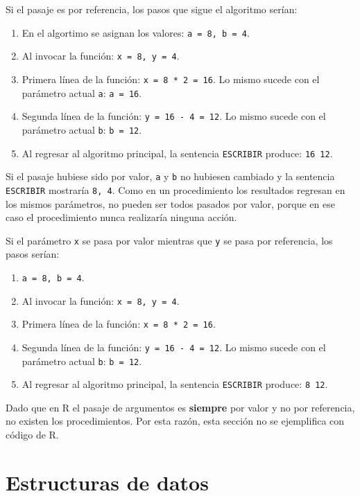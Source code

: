 \documentclass[
]{book}
\providecommand{\tightlist}{%
  \setlength{\itemsep}{0pt}\setlength{\parskip}{0pt}}
\begin{document}
Si el pasaje es por referencia, los pasos que sigue el algoritmo serían:

\begin{enumerate}
\def\labelenumi{\arabic{enumi}.}
\tightlist
\item
  En el algortimo se asignan los valores: \texttt{a\ =\ 8,\ b\ =\ 4}.
\item
  Al invocar la función: \texttt{x\ =\ 8,\ y\ =\ 4}.
\item
  Primera línea de la función: \texttt{x\ =\ 8\ *\ 2\ =\ 16}. Lo mismo sucede con el parámetro actual \texttt{a}: \texttt{a\ =\ 16}.
\item
  Segunda línea de la función: \texttt{y\ =\ 16\ -\ 4\ =\ 12}. Lo mismo sucede con el parámetro actual \texttt{b}: \texttt{b\ =\ 12}.
\item
  Al regresar al algoritmo principal, la sentencia \texttt{ESCRIBIR} produce: \texttt{16\ 12}.
\end{enumerate}

Si el pasaje hubiese sido por valor, \texttt{a} y \texttt{b} no hubiesen cambiado y la sentencia \texttt{ESCRIBIR} mostraría \texttt{8,\ 4}. Como en un procedimiento los resultados regresan en los mismos parámetros, no pueden ser todos pasados por valor, porque en ese caso el procedimiento nunca realizaría ninguna acción.

Si el parámetro \texttt{x} se pasa por valor mientras que \texttt{y} se pasa por referencia, los pasos serían:

\begin{enumerate}
\def\labelenumi{\arabic{enumi}.}
\tightlist
\item
  \texttt{a\ =\ 8,\ b\ =\ 4}.
\item
  Al invocar la función: \texttt{x\ =\ 8,\ y\ =\ 4}.
\item
  Primera línea de la función: \texttt{x\ =\ 8\ *\ 2\ =\ 16}.
\item
  Segunda línea de la función: \texttt{y\ =\ 16\ -\ 4\ =\ 12}. Lo mismo sucede con el parámetro actual \texttt{b}: \texttt{b\ =\ 12}.
\item
  Al regresar al algoritmo principal, la sentencia \texttt{ESCRIBIR} produce: \texttt{8\ 12}.
\end{enumerate}

Dado que en R el pasaje de argumentos es \textbf{siempre} por valor y no por referencia, no existen los procedimientos. Por esta razón, esta sección no se ejemplifica con código de R.

\hypertarget{estructuras-de-datos}{%
\chapter{Estructuras de datos}\label{estructuras-de-datos}}
\end{document}
